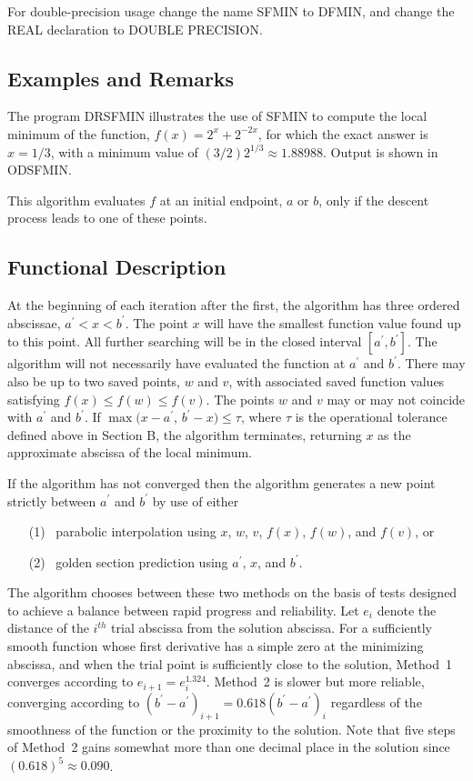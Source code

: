 \documentclass[twoside]{MATH77}
\begin{document}
For double-precision usage change the name SFMIN to DFMIN, and change the
REAL declaration to DOUBLE PRECISION.

\subsection{Examples and Remarks}

The program DRSFMIN illustrates the use of SFMIN to compute the local
minimum of the function, $f(x)=2^x+2^{-2x}$, for which the exact answer is $%
x=1/3$, with a minimum value of $(3/2)2^{1/3}\approx 1.88988$. Output is
shown in ODSFMIN.

This algorithm evaluates $f$ at an initial endpoint, $a$ or $b$, only if the
descent process leads to one of these points.

\subsection{Functional Description}

At the beginning of each iteration after the first, the algorithm has three
ordered abscissae, $a^{\prime}< x < b^{\prime}$. The point $x$ will have the
smallest function value found up to this point. All further searching will
be in the closed interval $[a^{\prime},b^{\prime}]$. The algorithm will not
necessarily have evaluated the function at $a^{\prime}$ and $b^{\prime}$.
There may also be up to two saved points, $w$ and $v$, with associated saved
function values satisfying $f(x) \leq f(w) \leq f(v)$. The points $w$ and $v$
may or may not coincide with $a^{\prime}$ and $b^{\prime}$. If $\max
(x-a^{\prime}$, $b^{\prime}-x) \leq \tau $, where $\tau $ is the operational
tolerance defined above in Section B, the algorithm terminates, returning $x$
as the approximate abscissa of the local minimum.

If the algorithm has not converged then the algorithm generates a new point
strictly between $a^{\prime}$ and $b^{\prime}$ by use of either
\begin{itemize}
\item[(1)]  \ parabolic interpolation using $x$, $w$, $v$, $f(x)$, $f(w)$,
and $f(v)$, or
\item[(2)]  \ golden section prediction using $a^{\prime}$, $x$, and $%
b^{\prime}.$
\end{itemize}
The algorithm chooses between these two methods on the basis of tests
designed to achieve a balance between rapid progress and reliability. Let $%
e_i$ denote the distance of the $i^{th}$ trial abscissa from the solution
abscissa. For a sufficiently smooth function whose first derivative has a
simple zero at the minimizing abscissa, and when the trial point is
sufficiently close to the solution, Method~1 converges according to $e_{i+1}
= e^{1.324}_i$. Method~2 is slower but more reliable, converging according
to $(b^{\prime}-a^{\prime})_{i+1} = 0.618(b^{\prime}-a^{\prime})_i$ regardless
of the smoothness of the function or the proximity to the solution. Note
that five steps of Method~2 gains somewhat more than one decimal place in
the solution since $(0.618)^5 \approx 0.090$.
\end{document}
